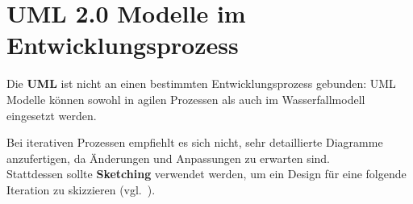 \section{UML 2.0 Modelle im Entwicklungsprozess}
Die \textbf{UML} ist nicht an einen bestimmten Entwicklungsprozess gebunden:
UML Modelle können sowohl in agilen Prozessen als auch im Wasserfallmodell eingesetzt werden.\\

 \begin{tcolorbox}[colback=white]
     Bei iterativen Prozessen empfiehlt es sich nicht, sehr detaillierte Diagramme anzufertigen, da Änderungen und Anpassungen zu erwarten sind.\\
     Stattdessen sollte \textbf{Sketching} verwendet werden, um ein Design für eine folgende Iteration zu skizzieren (vgl.~\cite[14]{Buh09}).
 \end{tcolorbox}